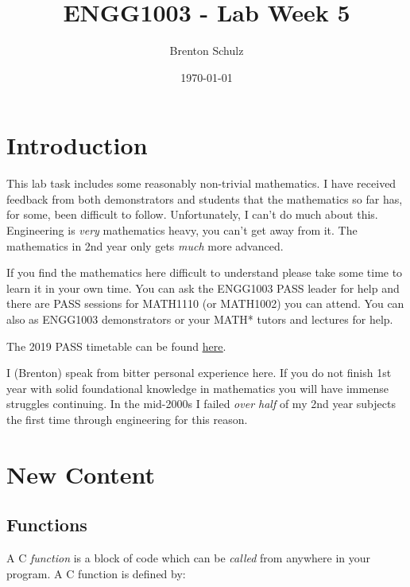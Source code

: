 \documentclass{lab}
\title{ENGG1003 - Lab Week 5}
\author{Brenton Schulz}
\date{\today}
\begin{document}
\maketitle

\section{Introduction}

This lab task includes some reasonably non-trivial mathematics. I have received feedback from both demonstrators and students that the mathematics so far has, for some, been difficult to follow. Unfortunately, I can't do much about this. Engineering is \textit{very} mathematics heavy, you can't get away from it. The mathematics in 2nd year only gets \textit{much} more advanced.

If you find the mathematics here difficult to understand please take some time to learn it in your own time. You can ask the ENGG1003 PASS leader for help and there are PASS sessions for MATH1110 (or MATH1002) you can attend. You can also as ENGG1003 demonstrators or your MATH* tutors and lectures for help.

The 2019 PASS timetable can be found \underline{\href{https://www.newcastle.edu.au/__data/assets/pdf_file/0003/137577/PASS-TT-Callaghan-S1-19.pdf}{here}}.

I (Brenton) speak from bitter personal experience here. If you do not finish 1st year with solid foundational knowledge in mathematics you will have immense struggles continuing. In the mid-2000s I failed \textit{over half} of my 2nd year subjects the first time through engineering for this reason.

\pagebreak
\section{New Content}

\subsection{Functions}

A C \textit{function} is a block of code which can be \textit{called} from anywhere in your program. A C function is defined by:
\end{document}
